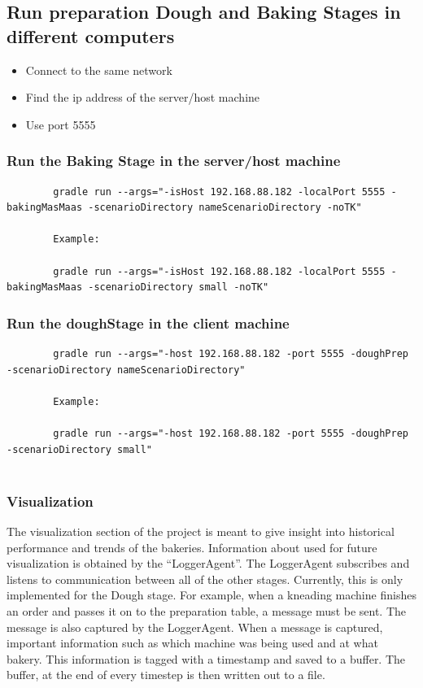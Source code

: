 \documentclass[paper=a4, fontsize=11pt]{scrartcl}
\begin{document}
	\subsection{Run preparation Dough and Baking Stages in different computers}

	\begin{itemize}
		\item Connect to the same network
		\item Find the ip address of the server/host machine
		\item Use port 5555
	\end{itemize}

	\subsubsection*{Run the Baking Stage in the server/host machine}

	\begin{lstlisting}
		gradle run --args="-isHost 192.168.88.182 -localPort 5555 -bakingMasMaas -scenarioDirectory nameScenarioDirectory -noTK"

		Example:

		gradle run --args="-isHost 192.168.88.182 -localPort 5555 -bakingMasMaas -scenarioDirectory small -noTK"

	\end{lstlisting}



	\subsubsection*{Run the doughStage in the client machine}

	\begin{lstlisting}
		gradle run --args="-host 192.168.88.182 -port 5555 -doughPrep -scenarioDirectory nameScenarioDirectory"

		Example:

		gradle run --args="-host 192.168.88.182 -port 5555 -doughPrep -scenarioDirectory small"


	\end{lstlisting}

	\subsubsection*{Visualization}

    The visualization section of the project is meant to give insight into
    historical performance and trends of the bakeries. Information about used
    for future visualization is obtained by the ``LoggerAgent''. The LoggerAgent
    subscribes and listens to communication between all of the other stages.
    Currently, this is only implemented for the Dough stage. For example, when
    a kneading machine finishes an order and passes it on to the preparation
    table, a message must be sent. The message is also captured by the LoggerAgent.
    When a message is captured, important information such as which machine
    was being used and at what bakery. This information is tagged with a timestamp
    and saved to a buffer. The buffer, at the end of every timestep is then
    written out to a file.
\end{document}

